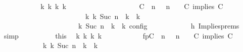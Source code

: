 \begin{isabellebody}
\ \ \ \ \ \ \ \ \isamarkupfalse%
\ \isamarkupfalse%
\ {\isacartoucheopen}{\isasymexists}{\isasymGamma}\isactrlsub k\ {\isasymPsi}\isactrlsub k\ {\isasymPhi}\isactrlsub k\ k{\isachardot}\isanewline
\ \ \ \ \ \ \ \ \ \ \ \ \ \ \ \ \ \ \ \ {\isacharparenleft}{\isacharparenleft}{\isacharparenleft}{\isacharparenleft}C\ {\isasymnot}{\isasymUp}\ n{\isacharparenright}\ {\isacharhash}\ {\isasymGamma}{\isacharparenright}{\isacharcomma}\ n\ {\isasymturnstile}\ {\isasymPsi}\ {\isasymtriangleright}\ {\isacharparenleft}{\isacharparenleft}C\ implies\ C\ {\isacharhash}\ {\isasymPhi}{\isacharparenright}{\isacharparenright}\isanewline
\ \ \ \ \ \ \ \ \ \ \ \ \ \ \ \ \ \ \ \ \ \ \ \ {\isasymhookrightarrow}\isactrlbsup k\isactrlesup \ {\isacharparenleft}{\isasymGamma}\isactrlsub k{\isacharcomma}\ Suc\ n\ {\isasymturnstile}\ {\isasymPsi}\isactrlsub k\ {\isasymtriangleright}\ {\isasymPhi}\isactrlsub k{\isacharparenright}{\isacharparenright}\isanewline
\ \ \ \ \ \ \ \ \ \ \ \ \ \ \ \ \ \ {\isasymand}\ {\isasymrho}\ {\isasymin}\ {\isasymlbrakk}\ {\isasymGamma}\isactrlsub k{\isacharcomma}\ Suc\ n\ {\isasymturnstile}\ {\isasymPsi}\isactrlsub k\ {\isasymtriangleright}\ {\isasymPhi}\isactrlsub k\ {\isasymrbrakk}\isactrlsub c\isactrlsub o\isactrlsub n\isactrlsub f\isactrlsub i\isactrlsub g{\isacartoucheclose}\isanewline
\ \ \ \ \ \ \ \ \ \ \isamarkupfalse%
\ h{}\ Implies{\isachardot}prems\ \isamarkupfalse%
\ simp\isanewline
\ \ \ \ \ \ \ \ \isamarkupfalse%
\ this\ \isamarkupfalse%
\ {\isasymGamma}\isactrlsub k\ {\isasymPsi}\isactrlsub k\ {\isasymPhi}\isactrlsub k\ k\ \isanewline
\ \ \ \ \ \ \ \ \ \ fp{\isacharcolon}{\isacartoucheopen}{\isacharparenleft}{\isacharparenleft}{\isacharparenleft}{\isacharparenleft}C\ {\isasymnot}{\isasymUp}\ n{\isacharparenright}\ {\isacharhash}\ {\isasymGamma}{\isacharparenright}{\isacharcomma}\ n\ {\isasymturnstile}\ {\isasymPsi}\ {\isasymtriangleright}\ {\isacharparenleft}{\isacharparenleft}C\ implies\ C\ {\isacharhash}\ {\isasymPhi}{\isacharparenright}{\isacharparenright}\isanewline
\ \ \ \ \ \ \ \ \ \ \ \ {\isasymhookrightarrow}\isactrlbsup k\isactrlesup \ {\isacharparenleft}{\isasymGamma}\isactrlsub k{\isacharcomma}\ Suc\ n\ {\isasymturnstile}\ {\isasymPsi}\isactrlsub k\ {\isasymtriangleright}\ {\isasymPhi}\isactrlsub k{\isacharparenright}{\isacharparenright}{\isacartoucheclose}\isanewline

\end{isabellebody}
